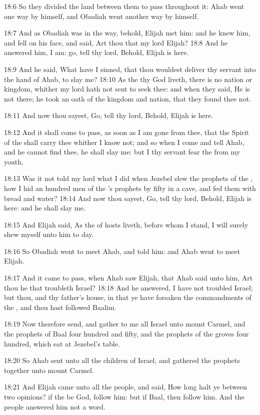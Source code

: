 18:6 So they divided the land between them to pass throughout it: Ahab went one way by himself, and Obadiah went another way by himself.

18:7 And as Obadiah was in the way, behold, Elijah met him: and he knew him, and fell on his face, and said, Art thou that my lord Elijah?  18:8 And he answered him, I am: go, tell thy lord, Behold, Elijah is here.

18:9 And he said, What have I sinned, that thou wouldest deliver thy servant into the hand of Ahab, to slay me?  18:10 As the \LORD thy God liveth, there is no nation or kingdom, whither my lord hath not sent to seek thee: and when they said, He is not there; he took an oath of the kingdom and nation, that they found thee not.

18:11 And now thou sayest, Go, tell thy lord, Behold, Elijah is here.

18:12 And it shall come to pass, as soon as I am gone from thee, that the Spirit of the \LORD shall carry thee whither I know not; and so when I come and tell Ahab, and he cannot find thee, he shall slay me: but I thy servant fear the \LORD from my youth.

18:13 Was it not told my lord what I did when Jezebel slew the prophets of the \LORD, how I hid an hundred men of the \LORD's prophets by fifty in a cave, and fed them with bread and water?  18:14 And now thou sayest, Go, tell thy lord, Behold, Elijah is here: and he shall slay me.

18:15 And Elijah said, As the \LORD of hosts liveth, before whom I stand, I will surely shew myself unto him to day.

18:16 So Obadiah went to meet Ahab, and told him: and Ahab went to meet Elijah.

18:17 And it came to pass, when Ahab saw Elijah, that Ahab said unto him, Art thou he that troubleth Israel?  18:18 And he answered, I have not troubled Israel; but thou, and thy father's house, in that ye have forsaken the commandments of the \LORD, and thou hast followed Baalim.

18:19 Now therefore send, and gather to me all Israel unto mount Carmel, and the prophets of Baal four hundred and fifty, and the prophets of the groves four hundred, which eat at Jezebel's table.

18:20 So Ahab sent unto all the children of Israel, and gathered the prophets together unto mount Carmel.

18:21 And Elijah came unto all the people, and said, How long halt ye between two opinions? if the \LORD be God, follow him: but if Baal, then follow him. And the people answered him not a word.

